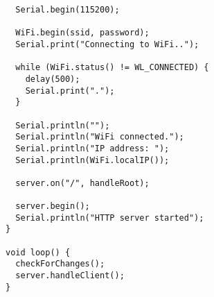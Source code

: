 \begin{verbatim}
  Serial.begin(115200);

  WiFi.begin(ssid, password);
  Serial.print("Connecting to WiFi..");

  while (WiFi.status() != WL_CONNECTED) {
    delay(500);
    Serial.print(".");
  }

  Serial.println("");
  Serial.println("WiFi connected.");
  Serial.println("IP address: ");
  Serial.println(WiFi.localIP());

  server.on("/", handleRoot);

  server.begin();
  Serial.println("HTTP server started");
}

void loop() {
  checkForChanges();
  server.handleClient();
}

\end{verbatim}